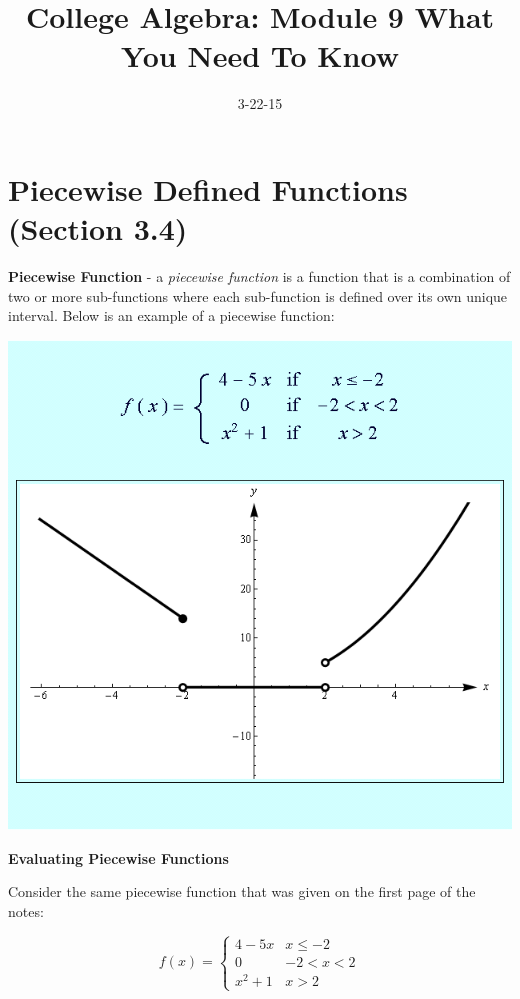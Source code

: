 \documentclass[12pt]{article}
\begin{document}
\title{College Algebra: Module 9 What You Need To Know}
\date{3-22-15}
\author{}
\maketitle


\section{Piecewise Defined Functions (Section 3.4)}

\textbf{Piecewise Function} - a \textit{piecewise function} is a function that is a combination of two or more sub-functions where each sub-function is defined over its own unique interval. Below is an example of a piecewise function:
\newline

\centerline{\includegraphics{PiecewiseFunction.png}}

\newpage

\textbf{Evaluating Piecewise Functions}

Consider the same piecewise function that was given on the first page of the notes:

 \begin{displaymath}
   f(x) = \left\{
     \begin{array}{lr}
       4-5x & x \leq -2\\
       0 & -2 < x < 2\\
      x^2 + 1 &   x > 2
     \end{array}
   \right.
\end{displaymath} 
\end{document}
